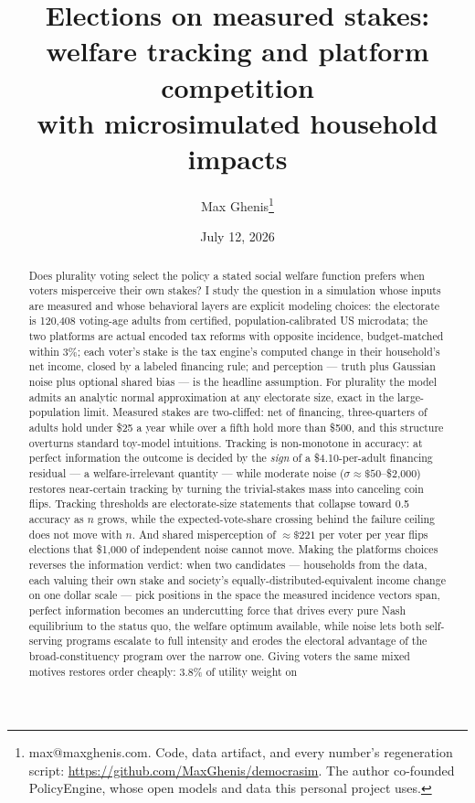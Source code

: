 \documentclass[11pt]{article}
\title{Elections on measured stakes:\\
welfare tracking and platform competition\\
with microsimulated household impacts}
\author{Max Ghenis\thanks{max@maxghenis.com. Code, data artifact, and every
number's regeneration script: \url{https://github.com/MaxGhenis/democrasim}.
The author co-founded PolicyEngine, whose open models and data this
personal project uses.}}
\date{July 12, 2026}
\begin{document}
\maketitle

\begin{abstract}
\noindent
Does plurality voting select the policy a stated social welfare function
prefers when voters misperceive their own stakes? I study the question in
a simulation whose inputs are measured and whose behavioral layers are
explicit modeling choices: the electorate is 120{,}408 voting-age adults
from certified, population-calibrated US microdata; the two platforms are
actual encoded tax reforms with opposite incidence, budget-matched within
3\%; each voter's stake is the tax engine's computed change in their
household's net income, closed by a labeled financing rule; and
perception --- truth plus Gaussian noise plus optional shared bias --- is
the headline assumption. For plurality the model admits an analytic
normal approximation at any electorate size, exact in the
large-population limit. Measured stakes are two-cliffed: net of financing, three-quarters of
adults hold under \$25 a year while over a fifth hold more than \$500,
and this structure overturns standard toy-model intuitions.
Tracking is non-monotone in accuracy: at perfect information the outcome is
decided by the \emph{sign} of a \$4.10-per-adult financing residual --- a
welfare-irrelevant quantity --- while moderate noise (\(\sigma \approx
\$50\)--\$2{,}000) restores near-certain tracking by turning the
trivial-stakes mass into canceling coin flips. Tracking thresholds are
electorate-size statements that collapse toward 0.5 accuracy as \(n\)
grows, while the expected-vote-share crossing behind the failure ceiling
does not move with \(n\). And shared misperception of
\(\approx\$221\) per voter per year flips elections that \$1{,}000 of
independent noise cannot move. Making the platforms choices reverses the
information verdict: when two candidates --- households from the data,
each valuing their own stake and society's equally-distributed-equivalent
income change on one dollar scale --- pick positions in the space the
measured incidence vectors span, perfect information becomes an
undercutting force that drives every pure Nash equilibrium to the status
quo, the welfare optimum available, while noise lets both self-serving
programs escalate to full intensity and erodes the electoral advantage of
the broad-constituency program over the narrow one. Giving voters the
same mixed motives restores order cheaply: 3.8\% of utility weight on

\end{abstract}
\end{document}
